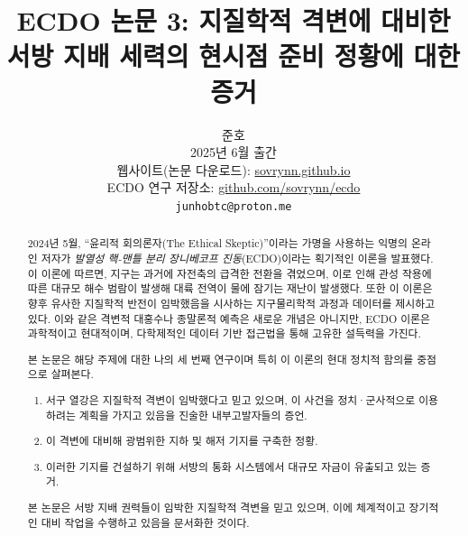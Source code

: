 \documentclass[10pt,twocolumn,letterpaper]{article}
\begin{document}
\title{ECDO 논문 3: 지질학적 격변에 대비한 서방 지배 세력의 현시점 준비 정황에 대한 증거}

\author{준호\\
2025년 6월 출간\\
웹사이트(논문 다운로드): \href{https://sovrynn.github.io}{sovrynn.github.io}\\
ECDO 연구 저장소: \href{https://github.com/sovrynn/ecdo}{github.com/sovrynn/ecdo}\\
{\tt\small junhobtc@proton.me}
}

\maketitle

\begin{abstract}
2024년 5월, “윤리적 회의론자(The Ethical Skeptic)”이라는 가명을 사용하는 익명의 온라인 저자가 \textit{발열성 핵-맨틀 분리 장니베코프 진동}(ECDO)이라는 획기적인 이론을 발표했다\cite{0,1}. 이 이론에 따르면, 지구는 과거에 자전축의 급격한 전환을 겪었으며, 이로 인해 관성 작용에 따른 대규모 해수 범람이 발생해 대륙 전역이 물에 잠기는 재난이 발생했다. 또한 이 이론은 향후 유사한 지질학적 반전이 임박했음을 시사하는 지구물리학적 과정과 데이터를 제시하고 있다. 이와 같은 격변적 대홍수나 종말론적 예측은 새로운 개념은 아니지만, ECDO 이론은 과학적이고 현대적이며, 다학제적인 데이터 기반 접근법을 통해 고유한 설득력을 가진다.

본 논문은 해당 주제에 대한 나의 세 번째 연구\cite{2,3}이며 특히 이 이론의 현대 정치적 함의를 중점으로 살펴본다.

\begin{flushleft}
\begin{enumerate}
    \item 서구 열강은 지질학적 격변이 임박했다고 믿고 있으며, 이 사건을 정치·군사적으로 이용하려는 계획을 가지고 있음을 진술한 내부고발자들의 증언.
    \item 이 격변에 대비해 광범위한 지하 및 해저 기지를 구축한 정황.
    \item 이러한 기지를 건설하기 위해 서방의 통화 시스템에서 대규모 자금이 유출되고 있는 증거.
\end{enumerate}
\end{flushleft}

본 논문은 서방 지배 권력들이 임박한 지질학적 격변을 믿고 있으며, 이에 체계적이고 장기적인 대비 작업을 수행하고 있음을 문서화한 것이다.
\end{abstract}
\end{document}
